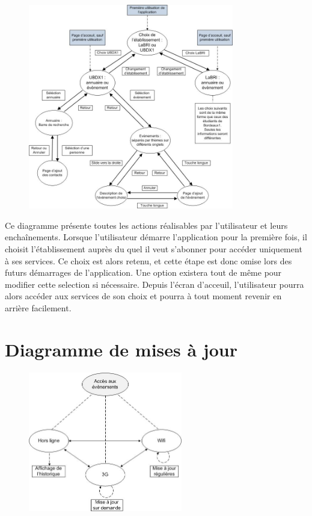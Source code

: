 \documentclass [pdftex,12pt] {report}
\begin{document}
\begin{figure}[h]
  \center
  \includegraphics[width=0.8\textwidth]{resources/useCases.jpg}
\end{figure}

\newpage
Ce diagramme présente toutes les actions réalisables par l'utilisateur et leurs enchaînements.
Lorsque l'utilisateur démarre l'application pour la première fois, il choisit l'établissement auprès du quel il veut s'abonner pour accéder uniquement à ses services. Ce choix est alors retenu, et cette étape est donc omise lors des futurs démarrages de l'application. Une option existera tout de même pour modifier cette selection si nécessaire. Depuis l'écran d'acceuil, l'utilisateur pourra alors accéder aux services de son choix et pourra à tout moment revenir en arrière facilement.

\section{Diagramme de mises à jour}

\begin{figure}[h]
  \center
  \includegraphics[width=0.6\textwidth]{resources/state_diagram.jpg}
\end{figure}
\end{document}
